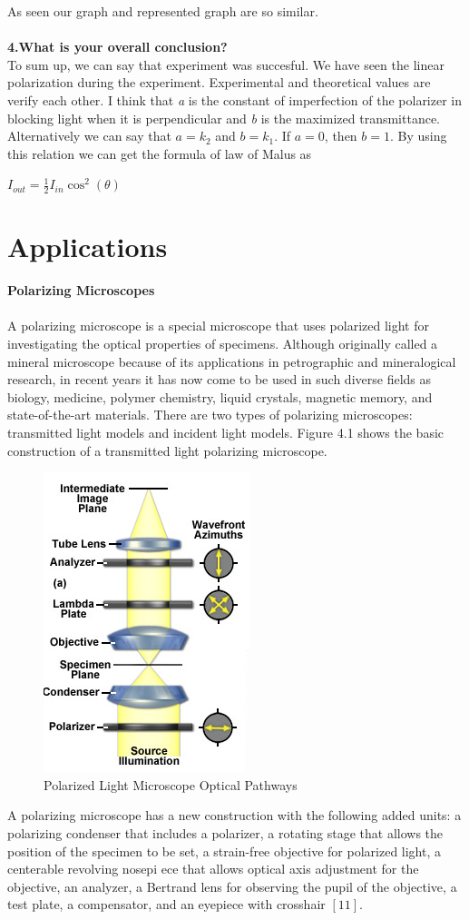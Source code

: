 \documentclass[a4paper,12pt]{report}
\begin{document}
As seen our graph and represented graph are so similar.\\\\  
\textbf{4.What is your overall conclusion?}\\
To sum up, we can say that experiment was succesful. We have seen the linear polarization during the experiment. Experimental and theoretical values are verify each other. I think that \textit{a} is the constant of imperfection of the polarizer in blocking light when it is perpendicular and \textit{b} is the maximized transmittance. Alternatively we can say that $a=k_{2}$ and $b=k_{1}$. If $a=0$, then $b=1$. By using this relation we can get the formula of law of Malus as 
\begin{center}
	$I_{out}=\frac{1}{2}I_{in}\cos^{2}(\theta)$  
\end{center}
\chapter{Applications}
\textbf{Polarizing Microscopes}\\\\
A polarizing microscope is a special microscope that uses
polarized light for investigating the optical properties of
specimens. Although originally called a mineral microscope
because of its applications in petrographic and
mineralogical research, in recent years it has now come
to be used in such diverse fields as biology, medicine,
polymer chemistry, liquid crystals, magnetic memory,
and state-of-the-art materials. There are two types of
polarizing microscopes: transmitted light models and
incident light models. Figure 4.1 shows the basic construction
of a transmitted light polarizing microscope.
\begin{figure}[h]
	\centering
	\includegraphics[width=0.30\linewidth, height=0.28\textheight]{app2}
	\caption{Polarized Light Microscope Optical Pathways}
	\label{fig:app2}
\end{figure}
A polarizing microscope has a new construction
with the following added units: a polarizing
condenser that includes a polarizer, a rotating
stage that allows the position of the specimen to
be set, a strain-free objective for polarized light, a
centerable revolving nosepi ece that allows optical
axis adjustment for the objective, an analyzer,
a Bertrand lens for observing the pupil of the
objective, a test plate, a compensator, and an
eyepiece with crosshair $[11]$. 
\end{document}

